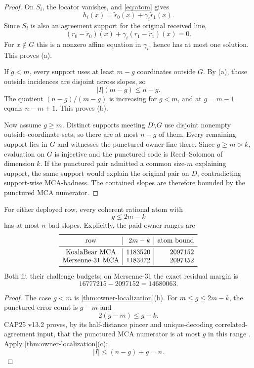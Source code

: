 \documentclass[11pt,a4paper]{amsart}
\numberwithin{equation}{section}
\theoremstyle{remark}
\begin{document}
\begin{proof}
On $S_i$, the locator vanishes, and \eqref{eq:atom} gives
\[
 h_i(x)=\widetilde r_0(x)+\gamma_i\widetilde r_1(x).
\]
Since $S_i$ is also an agreement support for the original received line,
\[
 (r_0-\widetilde r_0)(x)
 +\gamma_i(r_1-\widetilde r_1)(x)=0.
\]
For $x\notin G$ this is a nonzero affine equation in $\gamma_i$, hence has at most one solution.  This proves (a).

If $g<m$, every support uses at least $m-g$ coordinates outside $G$.  By (a), those outside incidences are disjoint across slopes, so
\[
 |I|(m-g)\le n-g.
\]
The quotient $(n-g)/(m-g)$ is increasing for $g<m$, and at $g=m-1$ equals $n-m+1$.  This proves (b).

Now assume $g\ge m$.  Distinct supports meeting $D\setminus G$ use disjoint nonempty outside-coordinate sets, so there are at most $n-g$ of them.  Every remaining support lies in $G$ and witnesses the punctured owner line there.  Since $g\ge m>k$, evaluation on $G$ is injective and the punctured code is Reed--Solomon of dimension $k$.  If the punctured pair admitted a common size-$m$ explaining support, the same support would explain the original pair on $D$, contradicting support-wise MCA-badness.  The contained slopes are therefore bounded by the punctured MCA numerator.
\end{proof}

\begin{corollary}\label{cor:small-owner}
For either deployed row, every coherent rational atom with
\[
 g\le2m-k
\]
has at most $n$ bad slopes.  Explicitly, the paid owner ranges are
\[
\begin{array}{c|r|r}
\toprule
\text{row}&2m-k&\text{atom bound}\\
\midrule
\text{KoalaBear MCA}&1183520&2097152\\
\text{Mersenne-31 MCA}&1183472&2097152\\
\bottomrule
\end{array}
\]
Both fit their challenge budgets; on Mersenne-31 the exact residual margin is
\[
 16777215-2097152=14680063.
\]
\end{corollary}

\begin{proof}
The case $g<m$ is \cref{thm:owner-localization}(b).  For $m\le g\le2m-k$, the punctured error count is $g-m$ and
\[
 2(g-m)\le g-k.
\]
CAP25 v13.2 proves, by its half-distance pincer and unique-decoding correlated-agreement input, that the punctured MCA numerator is at most $g$ in this range \cite{CAP25v132}.  Apply \cref{thm:owner-localization}(c):
\[
 |I|\le(n-g)+g=n.
\]
\end{proof}
\end{document}

